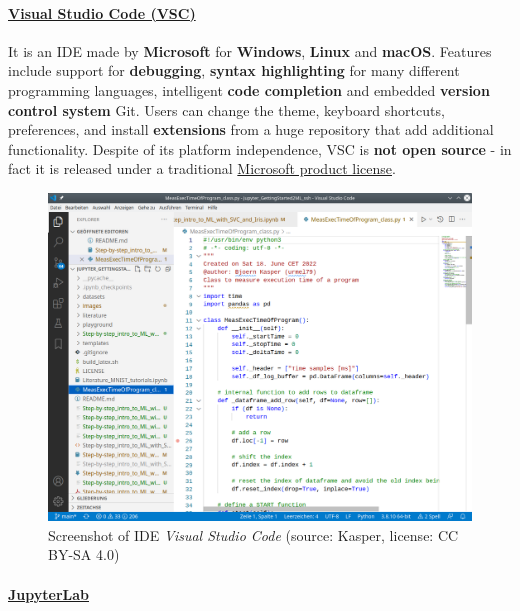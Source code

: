 \documentclass [oneside,10pt,a4paper,ngerman,BCOR10mm,headsepline,parindent,final]{scrartcl}
\begin{document}
    \hypertarget{visual-studio-code-vsc}{%
\paragraph{\texorpdfstring{\href{https://en.wikipedia.org/wiki/Visual_Studio_Code}{Visual
Studio Code
(VSC)}}{Visual Studio Code (VSC)}}\label{visual-studio-code-vsc}}

It is an IDE made by \textbf{Microsoft} for \textbf{Windows},
\textbf{Linux} and \textbf{macOS}. Features include support for
\textbf{debugging}, \textbf{syntax highlighting} for many different
programming languages, intelligent \textbf{code completion} and embedded
\textbf{version control system} Git. Users can change the theme,
keyboard shortcuts, preferences, and install \textbf{extensions} from a
huge repository that add additional functionality. Despite of its
platform independence, VSC is \textbf{not open source} - in fact it is
released under a traditional
\href{https://code.visualstudio.com/License/}{Microsoft product
license}.

\begin{figure}
\centering
\includegraphics{images/Screenshot_VSC.png}
\caption{Screenshot of IDE \emph{Visual Studio Code} (source: Kasper,
license: CC BY-SA 4.0)}
\end{figure}

    \hypertarget{jupyterlab}{%
\paragraph{\texorpdfstring{\href{https://en.wikipedia.org/wiki/Project_Jupyter\#Jupyter_Notebook}{JupyterLab}}{JupyterLab}}\label{jupyterlab}}
\end{document}

